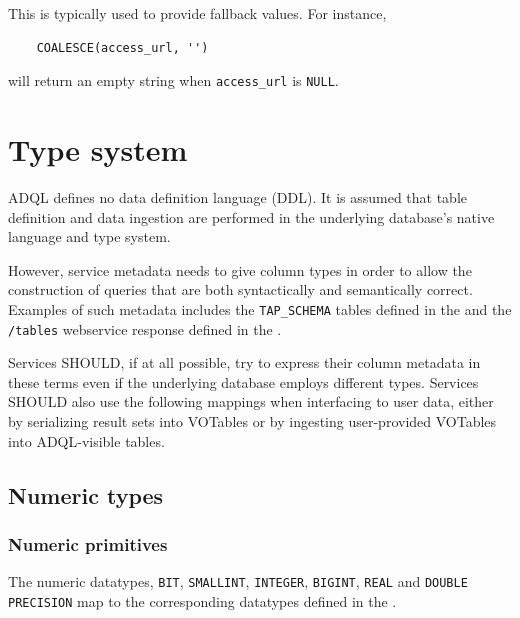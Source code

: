 \documentclass[11pt,a4paper]{ivoa}
\begin{document}
This is typically used to provide fallback values. For instance,

\begin{verbatim}
    COALESCE(access_url, '')
\end{verbatim}

\noindent will return an empty string when \verb|access_url| is \verb|NULL|.

\section{Type system}
\label{sec:types}

ADQL defines no data definition language (DDL).
It is assumed that table definition and data ingestion are performed in
the underlying database's native language and type system.

However, service metadata needs to give column types in order to allow the
construction of queries that are both syntactically and semantically correct.
Examples of such metadata includes the \verb:TAP_SCHEMA: tables defined in the
\TAPSpec{} and the \verb:/tables: webservice response defined in the
\VOSISpec{}.

Services SHOULD, if at all possible, try to express their column metadata in
these terms even if the underlying database employs different types.
Services SHOULD also use the following mappings when interfacing to user data,
either by serializing result sets into VOTables or by ingesting user-provided
VOTables into ADQL-visible tables.

\subsection{Numeric types}
\label{sec:types.numeric}

\subsubsection{Numeric primitives}
\label{sec:types.numeric.primitive}

The numeric datatypes, \verb:BIT:, \verb:SMALLINT:, \verb:INTEGER:,
\verb:BIGINT:, \verb:REAL:  \linebreak and \verb:DOUBLE PRECISION: map to the
corresponding datatypes defined in the \VOTableSpec{}.
\end{document}
